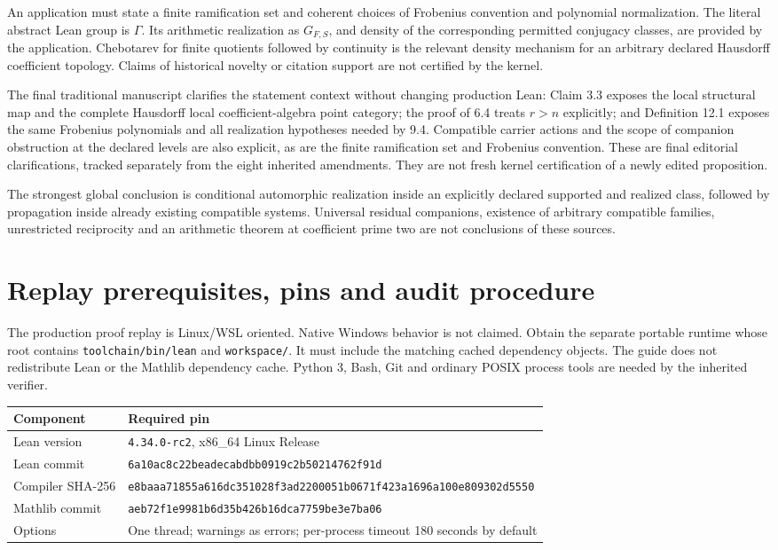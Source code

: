 \documentclass[11pt]{article}
\newcommand{\code}[1]{\nolinkurl{#1}}
\begin{document}
An application must state a finite ramification set and coherent choices of Frobenius convention and polynomial normalization. The literal abstract Lean group is \(\Gamma\). Its arithmetic realization as \(G_{F,S}\), and density of the corresponding permitted conjugacy classes, are provided by the application. Chebotarev for finite quotients followed by continuity is the relevant density mechanism for an arbitrary declared Hausdorff coefficient topology. Claims of historical novelty or citation support are not certified by the kernel.

The final traditional manuscript clarifies the statement context without changing production Lean: Claim 3.3 exposes the local structural map and the complete Hausdorff local coefficient-algebra point category; the proof of 6.4 treats \(r>n\) explicitly; and Definition 12.1 exposes the same Frobenius polynomials and all realization hypotheses needed by 9.4. Compatible carrier actions and the scope of companion obstruction at the declared levels are also explicit, as are the finite ramification set and Frobenius convention. These are final editorial clarifications, tracked separately from the eight inherited amendments. They are not fresh kernel certification of a newly edited proposition.

The strongest global conclusion is conditional automorphic realization inside an explicitly declared supported and realized class, followed by propagation inside already existing compatible systems. Universal residual companions, existence of arbitrary compatible families, unrestricted reciprocity and an arithmetic theorem at coefficient prime two are not conclusions of these sources.

\section{Replay prerequisites, pins and audit procedure}
The production proof replay is Linux/WSL oriented. Native Windows behavior is not claimed. Obtain the separate portable runtime whose root contains \code{toolchain/bin/lean} and \code{workspace/}. It must include the matching cached dependency objects. The guide does not redistribute Lean or the Mathlib dependency cache. Python 3, Bash, Git and ordinary POSIX process tools are needed by the inherited verifier.

\begin{tabular}{p{}p{}}
\toprule Component & Required pin\\\midrule
Lean version & \code{4.34.0-rc2}, x86\_64 Linux Release\\
Lean commit & \code{6a10ac8c22beadecabdbb0919c2b50214762f91d}\\
Compiler SHA-256 & \code{e8baaa71855a616dc351028f3ad2200051b0671f423a1696a100e809302d5550}\\
Mathlib commit & \code{aeb72f1e9981b6d35b426b16dca7759be3e7ba06}\\
Options & One thread; warnings as errors; per-process timeout 180 seconds by default\\
\bottomrule
\end{tabular}
\end{document}
